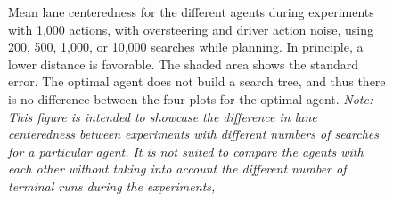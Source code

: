 \begin{figure}[htbp]
    \caption[Mean lane centeredness for the different agents in the experiments with the driver model with driver action noise and steering overcorrection]{Mean lane centeredness for the different agents during experiments with 1,000 actions, with oversteering and driver action noise, using  200, 500, 1,000, or 10,000 searches while planning. In principle, a lower distance is favorable. The shaded area shows the standard error. The optimal agent does not build a search tree, and thus there is no difference between the four plots for the optimal agent. \emph{Note: This figure is intended to showcase the difference in lane centeredness between experiments with different numbers of searches for a particular agent. It is not suited to compare the agents with each other without taking into account the different number of terminal runs during the experiments,}}
    \label{fig:lane_centeredness-a2}
\end{figure}